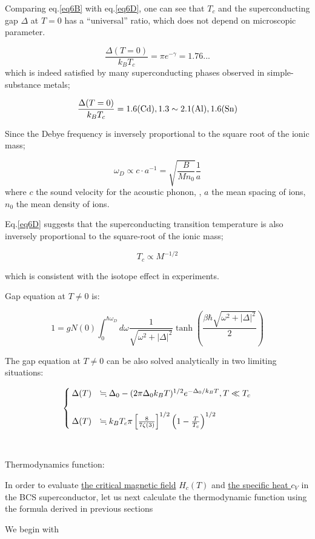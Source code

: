 Comparing eq.\eqref{eq6B} with eq.\eqref{eq6D}, one can see that $T_c$ and the superconducting gap $\Delta$ at $T=0$ has a ``universal'' ratio, which does not depend on microscopic parameter. 

\[\frac{\Delta(T=0)}{k_BT_c} = \pi e^{-\gamma} = 1.76... \]
which is indeed satisfied by many superconducting phases observed in simple-substance metals; 

\[\frac{\Delta(T=0)}{k_BT_c} = 1.6(\ce{Cd}), 1.3\sim2.1(\ce{Al}), 1.6(\ce{Sn}) \]

Since the Debye frequency is inversely proportional to the square root of the ionic mass;

\[\omega_D\propto c\cdot a^{-1} = \sqrt{\frac{B}{Mn_0}}\frac{1}{a} \]
where $c$ the sound velocity for the acoustic phonon, , $a$ the mean spacing of ions, $n_0$ the mean density of ions. 

Eq.\eqref{eq6D} suggests that the superconducting transition temperature is also inversely proportional to the square-root of the ionic mass; 

\[T_c\propto M^{-1/2} \]

which is consistent with the isotope effect in experiments. 

Gap equation at $T\neq 0$ is:

\[1=gN(0)\int_0^{\hbar\omega_D}d\omega\frac{1}{\sqrt{\omega^2+|\Delta|^2}}\tanh\left(\frac{\beta\hbar\sqrt{\omega^2+|\Delta|^2}}{2}\right) \]

The gap equation at $T\neq0$ can be also solved analytically in two limiting situations:

\[\begin{cases}
\Delta(T)&\fallingdotseq \Delta_0 - (2\pi\Delta_0k_BT)^{1/2}e^{-\Delta_0/k_BT}, T\ll T_c\\
&\\
\Delta(T)&\fallingdotseq k_BT_c\pi\left[\frac{8}{7\zeta(3)}\right]^{1/2}\left(1-\frac{T}{T_c}\right)^{1/2}
\end{cases}\]

\dotfill

\ 

Thermodynamics function:

In order to evaluate \uline{the critical magnetic field} $H_c(T)$ and \uline{the specific heat $c_V$} in the BCS superconductor, let us next calculate the thermodynamic function using the formula derived in previous sections %

We begin with

